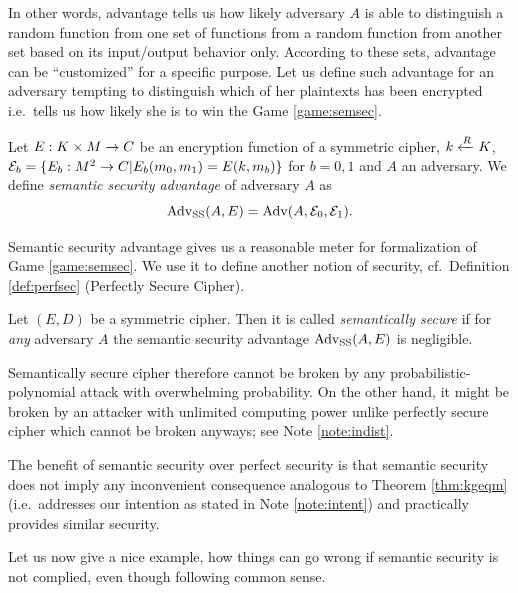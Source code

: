 In other words, advantage tells us how likely adversary $A$ is able to distinguish a random function from one set of functions from a random function from another set based on its input/output behavior only. According to these sets, advantage can be ``customized'' for a specific purpose. Let us define such advantage for an adversary tempting to distinguish which of her plaintexts has been encrypted i.e.\ tells us how likely she is to win the Game \ref{game:semsec}.

\begin{defn}
\label{def:ssadvant}
	Let $E: K\times M\rightarrow C$ be an encryption function of a symmetric cipher, $k\xleftarrow{R} K$, ${\cal E}_b = \{E_b:M^2\rightarrow C | E_b(m_0,m_1) = E(k,m_b)\}$ for $b=0,1$ and $A$ an adversary. We define {\em semantic security advantage} of adversary $A$ as
	\[
		\operatorname*{Adv_{SS}}(A,E) = \operatorname*{Adv}(A,{\cal E}_0,{\cal E}_1) .
	\]
\end{defn}

Semantic security advantage gives us a reasonable meter for formalization of Game \ref{game:semsec}. We use it to define another notion of security, cf.\ Definition \ref{def:perfsec} (Perfectly Secure Cipher).

\begin{defn}
\label{def:semsec}
	Let $(E,D)$ be a symmetric cipher. Then it is called {\em semantically secure} if for {\em any} adversary $A$ the semantic security advantage $\operatorname*{Adv_{SS}}(A,E)$ is negligible.
\end{defn}

Semantically secure cipher therefore cannot be broken by any probabilistic-polynomial attack with overwhelming probability. On the other hand, it might be broken by an attacker with unlimited computing power unlike perfectly secure cipher which cannot be broken anyways; see Note \ref{note:indist}.

The benefit of semantic security over perfect security is that semantic security does not imply any inconvenient consequence analogous to Theorem \ref{thm:kgeqm} (i.e.\ addresses our intention as stated in Note \ref{note:intent}) and practically provides similar security.

Let us now give a nice example, how things can go wrong if semantic security is not complied, even though following common sense.

